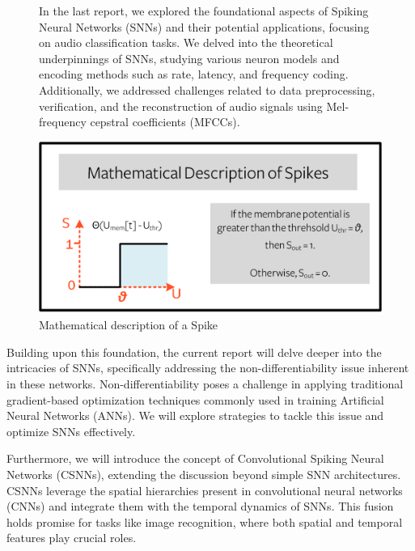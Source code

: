 \documentclass[11pt]{article}
\begin{document}
\begin{figure}[ht]
  \begin{minipage}[b]{0.45\textwidth}
    In the last report, we explored the foundational aspects of Spiking Neural Networks (SNNs) and their potential applications, focusing on audio classification tasks. We delved into the theoretical underpinnings of SNNs, studying various neuron models and encoding methods such as rate, latency, and frequency coding. Additionally, we addressed challenges related to data preprocessing, verification, and the reconstruction of audio signals using Mel-frequency cepstral coefficients (MFCCs).
  \end{minipage}
  \hfill
  \begin{minipage}[b]{0.5\textwidth}
    \centering
    \includegraphics[width=\textwidth]{./image/spike_description.png}
    \caption{Mathematical description of a Spike}
  \end{minipage}
\end{figure}

Building upon this foundation, the current report will delve deeper into the intricacies of SNNs, specifically addressing the non-differentiability issue inherent in these networks. Non-differentiability poses a challenge in applying traditional gradient-based optimization techniques commonly used in training Artificial Neural Networks (ANNs). We will explore strategies to tackle this issue and optimize SNNs effectively.

Furthermore, we will introduce the concept of Convolutional Spiking Neural Networks (CSNNs), extending the discussion beyond simple SNN architectures. CSNNs leverage the spatial hierarchies present in convolutional neural networks (CNNs) and integrate them with the temporal dynamics of SNNs. This fusion holds promise for tasks like image recognition, where both spatial and temporal features play crucial roles.
\end{document}
